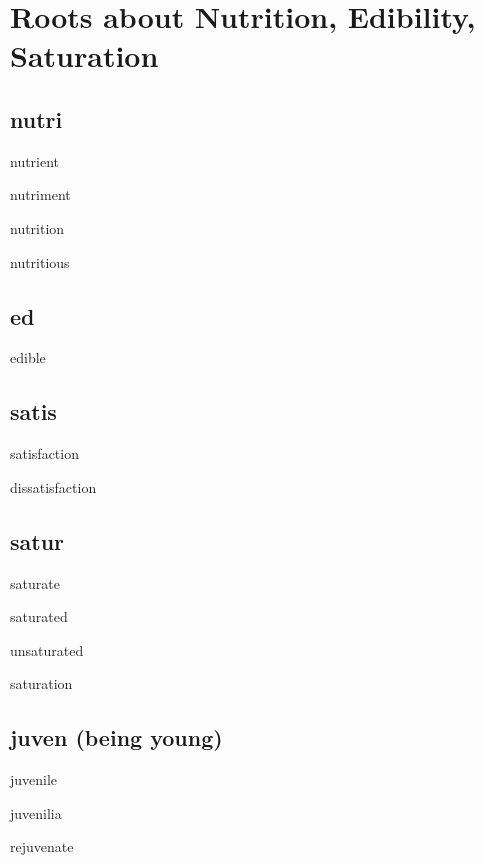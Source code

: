 \chapter{Roots about Nutrition, Edibility, Saturation}
\section{nutri}

\begin{RefWord}{nutrient}
\end{RefWord}

\begin{RefWord}{nutriment}
\end{RefWord}

\begin{RefWord}{nutrition}
\end{RefWord}

\begin{RefWord}{nutritious}
\end{RefWord}

\section{ed}

\begin{RefWord}{edible}
\end{RefWord}

\section{satis}

\begin{RefWord}{satisfaction}
\end{RefWord}

\begin{RefWord}{dissatisfaction}
\end{RefWord}


\section{satur}

\begin{RefWord}{saturate}
\end{RefWord}

\begin{RefWord}{saturated}
\end{RefWord}

\begin{RefWord}{unsaturated}
\end{RefWord}

\begin{RefWord}{saturation}
\end{RefWord}

\section{juven (being young)}

\begin{RefWord}{juvenile}
\end{RefWord}

\begin{RefWord}{juvenilia}
\end{RefWord}

\begin{RefWord}{rejuvenate}
\end{RefWord}